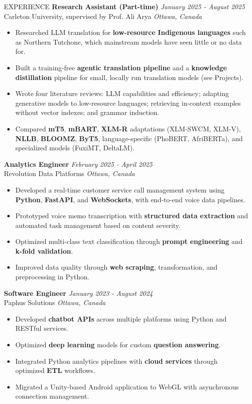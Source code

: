 \documentclass{resume}
\begin{document}
\begin{rSection}{EXPERIENCE}
\textbf{Research Assistant (Part-time)} \hfill \textit{January 2025 - August 2025}\\
Carleton University, supervised by Prof. Ali Arya \hfill \textit{Ottawa, Canada}
 \begin{itemize}
    \itemsep -3pt {}
    \item Researched LLM translation for \textbf{low-resource Indigenous languages} such as Northern Tutchone, which mainstream models have seen little or no data for.
    \item Built a training-free \textbf{agentic translation pipeline} and a \textbf{knowledge distillation} pipeline for small, locally run translation models (see Projects).
    \item Wrote four literature reviews: LLM capabilities and efficiency; adapting generative models to low-resource languages; retrieving in-context examples without vector indexes; and grammar induction.
    \item Compared \textbf{mT5}, \textbf{mBART}, \textbf{XLM-R} adaptations (XLM-SWCM, XLM-V), \textbf{NLLB}, \textbf{BLOOMZ}, \textbf{ByT5}, language-specific (PhoBERT, AfriBERTa), and specialized models (FuxiMT, DeltaLM).
 \end{itemize}

\textbf{Analytics Engineer} \hfill \textit{February 2025 - April 2025}\\
Revolution Data Platforms \hfill \textit{Ottawa, Canada}
 \begin{itemize}
    \itemsep -3pt {}
    \item Developed a real-time customer service call management system using \textbf{Python}, \textbf{FastAPI}, and \textbf{WebSockets}, with end-to-end voice data pipelines.
    \item Prototyped voice memo transcription with \textbf{structured data extraction} and automated task management based on content severity.
    \item Optimized multi-class text classification through \textbf{prompt engineering} and \textbf{k-fold validation}.
    \item Improved data quality through \textbf{web scraping}, transformation, and preprocessing in Python.
 \end{itemize}

\textbf{Software Engineer} \hfill \textit{January 2023 - August 2024}\\
Paphus Solutions \hfill \textit{Ottawa, Canada}
 \begin{itemize}
    \itemsep -3pt {}
    \item Developed \textbf{chatbot APIs} across multiple platforms using Python and RESTful services.
    \item Optimized \textbf{deep learning} models for custom \textbf{question answering}.
    \item Integrated Python analytics pipelines with \textbf{cloud services} through optimized \textbf{ETL} workflows.
    \item Migrated a Unity-based Android application to WebGL with asynchronous connection management.
 \end{itemize}


\end{rSection}
\end{document}
